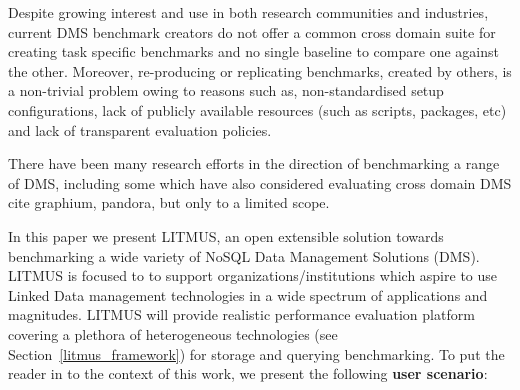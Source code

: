\documentclass{llncs}
\begin{document}
    Despite growing interest and use in both research communities and industries, current DMS benchmark creators do not offer a common cross domain suite for creating task specific benchmarks and no single baseline to compare one against the other. Moreover, re-producing or replicating benchmarks, created by others, is a non-trivial problem owing to reasons such as, non-standardised setup configurations, lack of publicly available resources (such as scripts, packages, etc) and lack of transparent evaluation policies. 
    
    There have been many research efforts in the direction of benchmarking a range of DMS, including some which have also considered evaluating cross domain DMS {cite graphium, pandora}, but only to a limited scope. 
    
    
    In this paper we present LITMUS, an open extensible solution towards benchmarking a wide variety of NoSQL Data Management Solutions (DMS). LITMUS is focused to to support organizations/institutions which aspire to use Linked Data management technologies in a wide spectrum of applications and magnitudes. 
    LITMUS will provide realistic performance evaluation platform covering a plethora of heterogeneous technologies (see Section~\ref{litmus_framework}) for storage and querying benchmarking. To put the reader in to the context of this work, we present the following \textbf{user scenario}: 
    
\end{document}
